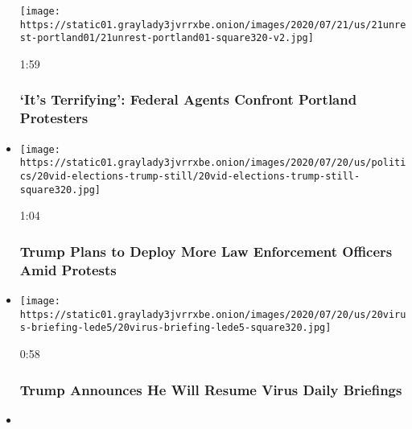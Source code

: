 \begin{itemize}
  \texttt{[image: https://static01.graylady3jvrrxbe.onion/images/2020/07/21/us/21unrest-portland01/21unrest-portland01-square320-v2.jpg]}

  1:59

  \hypertarget{its-terrifying-federal-agents-confront-portland-protesters}{%
  \subsubsection{`It's Terrifying': Federal Agents Confront Portland
  Protesters}\label{its-terrifying-federal-agents-confront-portland-protesters}}
\item
  \href{https://www.nytimes3xbfgragh.onion/video/us/100000007247868/trump-deploy-federal-agents.html?action=click\&module=video-series-bar\&region=header\&pgtype=Article\&playlistId=video/u-s}{}

  \texttt{[image: https://static01.graylady3jvrrxbe.onion/images/2020/07/20/us/politics/20vid-elections-trump-still/20vid-elections-trump-still-square320.jpg]}

  1:04

  \hypertarget{trump-plans-to-deploy-more-law-enforcement-officers-amid-protests}{%
  \subsubsection{Trump Plans to Deploy More Law Enforcement Officers
  Amid
  Protests}\label{trump-plans-to-deploy-more-law-enforcement-officers-amid-protests}}
\item
  \href{https://www.nytimes3xbfgragh.onion/video/us/100000007247407/trump-will-resume-virus-briefings.html?action=click\&module=video-series-bar\&region=header\&pgtype=Article\&playlistId=video/u-s}{}

  \texttt{[image: https://static01.graylady3jvrrxbe.onion/images/2020/07/20/us/20virus-briefing-lede5/20virus-briefing-lede5-square320.jpg]}

  0:58

  \hypertarget{trump-announces-he-will-resume-virus-daily-briefings}{%
  \subsubsection{Trump Announces He Will Resume Virus Daily
  Briefings}\label{trump-announces-he-will-resume-virus-daily-briefings}}
\item
  \href{https://www.nytimes3xbfgragh.onion/video/us/100000007244908/newsom-california-schools.html?action=click\&module=video-series-bar\&region=header\&pgtype=Article\&playlistId=video/u-s}{}


\end{itemize}
